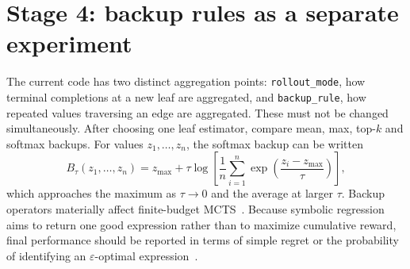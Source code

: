 \section{Stage 4: backup rules as a separate experiment}

The current code has two distinct aggregation points: \texttt{rollout\_mode}, how
terminal completions at a new leaf are aggregated, and \texttt{backup\_rule}, how
repeated values traversing an edge are aggregated. These must not be changed
simultaneously. After choosing one leaf estimator, compare mean, max, top-$k$ and
softmax backups. For values $z_1,\ldots,z_n$, the softmax backup can be written
\[
  B_\tau(z_1,\ldots,z_n)
    = z_{\max}+\tau\log\!\left[\frac1n\sum_{i=1}^n
        \exp\!\left(\frac{z_i-z_{\max}}{\tau}\right)\right],
\]
which approaches the maximum as $\tau\to 0$ and the average at larger $\tau$.
Backup operators materially affect finite-budget
MCTS~\cite{khandelwal2016backup,dam2024power}. Because symbolic regression aims to
return one good expression rather than to maximize cumulative reward, final
performance should be reported in terms of simple regret or the probability of
identifying an $\varepsilon$-optimal expression~\cite{zhao2023simple}.
